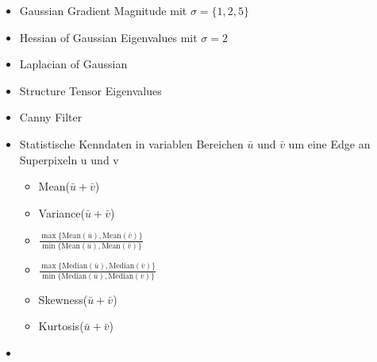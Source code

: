 \begin{itemize}
	\item Gaussian Gradient Magnitude mit $\sigma=\{1, 2, 5\}$
	\item Hessian of Gaussian Eigenvalues mit $\sigma=2$
	\item Laplacian of Gaussian
	\item Structure Tensor Eigenvalues
	\item Canny Filter
	\item Statistische Kenndaten in variablen Bereichen $\bar{u}$ und $\bar{v}$ um eine Edge an Superpixeln u und v
	\begin{itemize}
		\item Mean($\bar{u} + \bar{v}$)
		\item Variance($\bar{u} + \bar{v}$)
		\item $\frac{\max{\{\text{Mean}(\bar{u}), \text{Mean}(\bar{v}) \}}}{\min{\{\text{Mean}(\bar{u}), \text{Mean}(\bar{v})}\}}$
		\item $\frac{\max{\{\text{Median}(\bar{u}), \text{Median}(\bar{v}) \}}}{\min{\{\text{Median}(\bar{u}), \text{Median}(\bar{v})}\}}$
		\item Skewness($\bar{u} + \bar{v}$)
		\item Kurtosis($\bar{u} + \bar{v}$)
	\end{itemize}
	\item 
\end{itemize}





